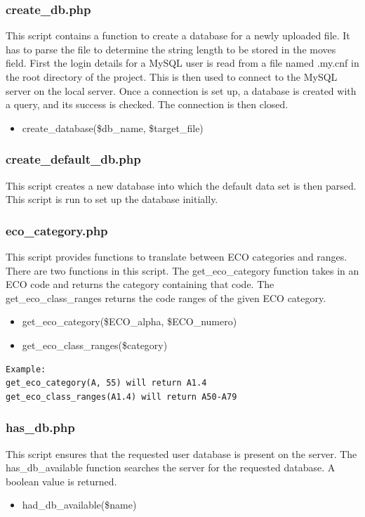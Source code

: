 \documentclass{article}
\begin{document}
\subsubsection{create\_db.php}
This script contains a function to create a database for a newly uploaded
file. It has to parse the file to determine the string length to be stored
in the moves field. First the login details for a MySQL user is read from
a file named .my.cnf in the root directory of the project.  This is then
used to connect to the MySQL server on the local server.  Once a connection
is set up, a database is created with a query, and its success is checked.
The connection is then closed.
\begin{itemize}
	\item create\_database(\$db\_name, \$target\_file)
\end{itemize}

\subsubsection{create\_default\_db.php}
This script creates a new database into which the default data set is then
parsed. This script is run to set up the database initially.

\subsubsection{eco\_category.php}
This script provides functions to translate between ECO categories and ranges.
There are two functions in this script. The get\_eco\_category function takes
in an ECO code and returns the category containing that code. The
get\_eco\_class\_ranges returns the code ranges of the given ECO category.
\begin{itemize}
	\item get\_eco\_category(\$ECO\_alpha, \$ECO\_numero)
	\item get\_eco\_class\_ranges(\$category)
\end{itemize}
\begin{lstlisting}
Example:
get_eco_category(A, 55) will return A1.4
get_eco_class_ranges(A1.4) will return A50-A79
\end{lstlisting}

\subsubsection{has\_db.php}
This script ensures that the requested user database is present on the server.
The has\_db\_available function searches the server for the requested database.
A boolean value is returned.
\begin{itemize}
	\item had\_db\_available(\$name)
\end{itemize}
\end{document}
